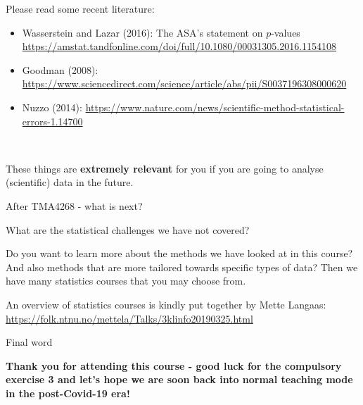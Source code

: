 \documentclass[10pt,ignorenonframetext,]{beamer}
\providecommand{\tightlist}{%
  \setlength{\itemsep}{0pt}\setlength{\parskip}{0pt}}
\begin{document}
\begin{frame}

Please read some recent literature:

\begin{itemize}
\tightlist
\item
  Wasserstein and Lazar (2016): The ASA's statement on \(p\)-values
  \url{https://amstat.tandfonline.com/doi/full/10.1080/00031305.2016.1154108}
\item
  Goodman (2008):
  \url{https://www.sciencedirect.com/science/article/abs/pii/S0037196308000620}
\item
  Nuzzo (2014):
  \url{https://www.nature.com/news/scientific-method-statistical-errors-1.14700}
\end{itemize}

\(~\)

These things are \textbf{extremely relevant} for you if you are going to
analyse (scientific) data in the future.

\end{frame}

\begin{frame}{After TMA4268 - what is next?}
\protect\hypertarget{after-tma4268---what-is-next}{}

What are the statistical challenges we have not covered?

Do you want to learn more about the methods we have looked at in this
course? And also methods that are more tailored towards specific types
of data? Then we have many statistics courses that you may choose from.

An overview of statistics courses is kindly put together by Mette
Langaas: \url{https://folk.ntnu.no/mettela/Talks/3klinfo20190325.html}

\end{frame}

\begin{frame}{Final word}
\protect\hypertarget{final-word}{}

\textbf{Thank you for attending this course - good luck for the
compulsory exercise 3 and let's hope we are soon back into normal
teaching mode in the post-Covid-19 era!}

\end{frame}
\end{document}
